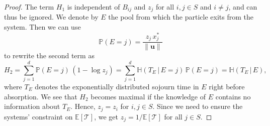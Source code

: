 \documentclass[smallextended]{svjour3}
\renewcommand{\vec}[1]{\mathbf{#1}}
\renewcommand{\P}{\mathbb{P}}
\newcommand{\E}{\mathbb{E}}
\newcommand{\TT}{\mathcal{T}}
\renewcommand{\H}{\mathbb{H}}
\newcommand{\suml}{\sum\limits}
\newcommand{\vnorms}[1]{\|#1\|}
\begin{document}
\begin{proof}
		The term $H_1$ is independent of $B_{ij}$ and $z_j$ for all $i,j\in S$ and $i\neq j$, and can thus be ignored.
		We denote by $E$ the pool from which the particle exits from the system.
		Then we can use \citep[Sect.~5.3]{Metzler2018MGS}
		\begin{equation}
		  \P(E=j) = \frac{z_j\,x^\ast_j}{\vnorms{\vec{u}}}
		\end{equation}
    to rewrite the second term as
		\begin{equation}
			H_2 = \suml_{j=1}^d \P(E=j)\,(1-\log z_j) = \suml_{j=1}^d \H(T_E\,|\,E=j)\,\P(E=j) = \H(T_E\,|\,E),
		\end{equation}
		where $T_E$ denotes the exponentially distributed sojourn time in $E$ right before absorption.
		We see that $H_2$ becomes maximal if the knowledge of $E$ contains no information about $T_E$.
		Hence, $z_j=z_i$ for $i,j\in S$.
		Since we need to ensure the systems' constraint on $\E\left[\TT\right]$, we get $z_j=1/\E\left[\TT\right]$ for all $j\in S$.


\end{proof}
\end{document}
